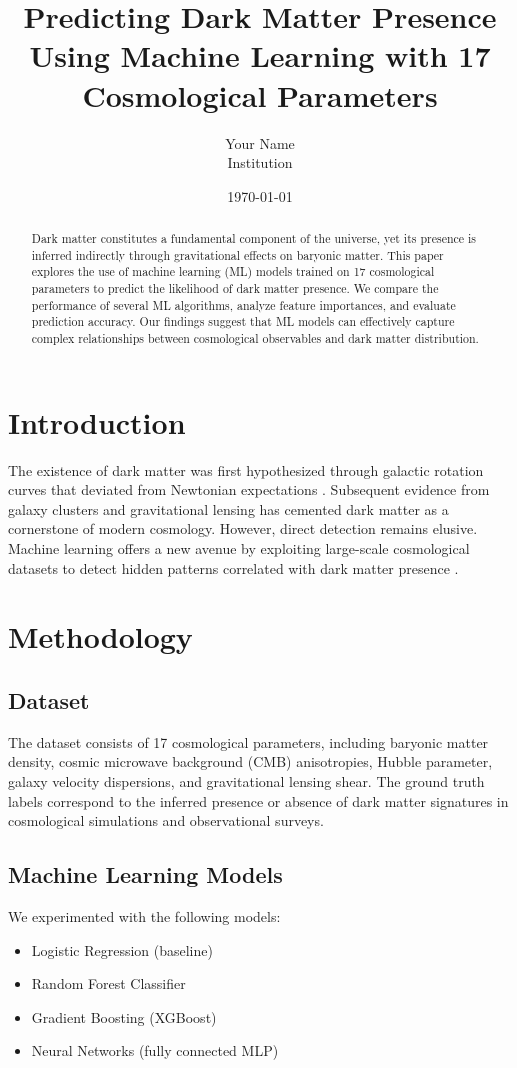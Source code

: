 \documentclass[12pt]{article}
\title{Predicting Dark Matter Presence Using Machine Learning with 17 Cosmological Parameters}
\author{Your Name \\ Institution}
\date{\today}
\begin{document}
\maketitle

\begin{abstract}
Dark matter constitutes a fundamental component of the universe, yet its presence is inferred indirectly through gravitational effects on baryonic matter. This paper explores the use of machine learning (ML) models trained on 17 cosmological parameters to predict the likelihood of dark matter presence. We compare the performance of several ML algorithms, analyze feature importances, and evaluate prediction accuracy. Our findings suggest that ML models can effectively capture complex relationships between cosmological observables and dark matter distribution.
\end{abstract}

\section{Introduction}
The existence of dark matter was first hypothesized through galactic rotation curves that deviated from Newtonian expectations \cite{rubin1970}. Subsequent evidence from galaxy clusters and gravitational lensing \cite{clowe2006} has cemented dark matter as a cornerstone of modern cosmology. However, direct detection remains elusive. Machine learning offers a new avenue by exploiting large-scale cosmological datasets to detect hidden patterns correlated with dark matter presence \cite{rubin1970}.

\section{Methodology}
\subsection{Dataset}
The dataset consists of 17 cosmological parameters, including baryonic matter density, cosmic microwave background (CMB) anisotropies, Hubble parameter, galaxy velocity dispersions, and gravitational lensing shear. The ground truth labels correspond to the inferred presence or absence of dark matter signatures in cosmological simulations and observational surveys.

\subsection{Machine Learning Models}
We experimented with the following models:
\begin{itemize}
  \item Logistic Regression (baseline)
  \item Random Forest Classifier \cite{breiman2001}
  \item Gradient Boosting (XGBoost) \cite{chen2016}
  \item Neural Networks (fully connected MLP)
\end{itemize}
\end{document}
